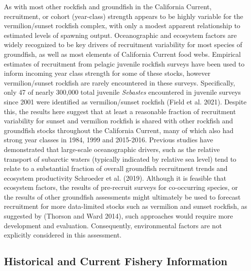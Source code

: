 \documentclass[11pt,
  english,
]{article}
\begin{document}
As with most other rockfish and groundfish in the California Current, recruitment, or cohort (year-class) strength appears to be highly variable for the vermilion/sunset rockfish complex, with only a modest apparent relationship to estimated levels of spawning output. Oceanographic and ecosystem factors are widely recognized to be key drivers of recruitment variability for most species of groundfish, as well as most elements of California Current food webs. Empirical estimates of recruitment from pelagic juvenile rockfish surveys have been used to inform incoming year class strength for some of these stocks, however vermilion/sunset rockfish are rarely encountered in these surveys. Specifically, only 47 of nearly 300,000 total juvenile \emph{Sebastes} encountered in juvenile surveys since 2001 were identified as vermilion/sunset rockfish {(Field et al. 2021)\leavevmode\tagmcend\tagstructend}. Despite this, the results here suggest that at least a reasonable fraction of recruitment variability for sunset and vermilion rockfish is shared with other rockfish and groundfish stocks throughout the California Current, many of which also had strong year classes in 1984, 1999 and 2015-2016. Previous studies have demonstrated that large-scale oceanographic drivers, such as the relative transport of subarctic waters (typically indicated by relative sea level) tend to relate to a substantial fraction of overall groundfish recruitment trends and ecosystem productivity {Schroeder et al. (2019)\leavevmode\tagmcend\tagstructend}. Although it is feasible that ecosystem factors, the results of pre-recruit surveys for co-occurring species, or the results of other groundfish assessments might ultimately be used to forecast recruitment for more data-limited stocks such as vermilion and sunset rockfish, as suggested by {(Thorson and Ward 2014)\leavevmode\tagmcend\tagstructend}, such approaches would require more development and evaluation. Consequently, environmental factors are not explicitly considered in this assessment.

\FloatBarrier


\hypertarget{historical-and-current-fishery-information}{%
\subsection{Historical and Current Fishery Information}\label{historical-and-current-fishery-information}}
\end{document}
